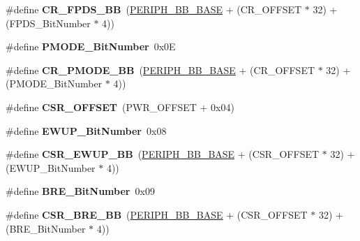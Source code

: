 \begin{DoxyCompactItemize}
\item 
\hypertarget{group___p_w_r_ga57d7041b5d1bf0ec94fa18152a7fa208}{}\#define {\bfseries C\+R\+\_\+\+F\+P\+D\+S\+\_\+\+B\+B}~(\hyperlink{group___peripheral__memory__map_gaed7efc100877000845c236ccdc9e144a}{P\+E\+R\+I\+P\+H\+\_\+\+B\+B\+\_\+\+B\+A\+S\+E} + (C\+R\+\_\+\+O\+F\+F\+S\+E\+T $\ast$ 32) + (F\+P\+D\+S\+\_\+\+Bit\+Number $\ast$ 4))\label{group___p_w_r_ga57d7041b5d1bf0ec94fa18152a7fa208}

\item 
\hypertarget{group___p_w_r_ga15fea9df1b0d324394336f70b319b377}{}\#define {\bfseries P\+M\+O\+D\+E\+\_\+\+Bit\+Number}~0x0\+E\label{group___p_w_r_ga15fea9df1b0d324394336f70b319b377}

\item 
\hypertarget{group___p_w_r_ga2e7c040f5c63f0fce3e274d9a03f1d1a}{}\#define {\bfseries C\+R\+\_\+\+P\+M\+O\+D\+E\+\_\+\+B\+B}~(\hyperlink{group___peripheral__memory__map_gaed7efc100877000845c236ccdc9e144a}{P\+E\+R\+I\+P\+H\+\_\+\+B\+B\+\_\+\+B\+A\+S\+E} + (C\+R\+\_\+\+O\+F\+F\+S\+E\+T $\ast$ 32) + (P\+M\+O\+D\+E\+\_\+\+Bit\+Number $\ast$ 4))\label{group___p_w_r_ga2e7c040f5c63f0fce3e274d9a03f1d1a}

\item 
\hypertarget{group___p_w_r_ga984cbe73312b6d3d355c5053763d499a}{}\#define {\bfseries C\+S\+R\+\_\+\+O\+F\+F\+S\+E\+T}~(P\+W\+R\+\_\+\+O\+F\+F\+S\+E\+T + 0x04)\label{group___p_w_r_ga984cbe73312b6d3d355c5053763d499a}

\item 
\hypertarget{group___p_w_r_ga94fe0520e8f9b71fa2b99c0565ec70ea}{}\#define {\bfseries E\+W\+U\+P\+\_\+\+Bit\+Number}~0x08\label{group___p_w_r_ga94fe0520e8f9b71fa2b99c0565ec70ea}

\item 
\hypertarget{group___p_w_r_gaaff864595f697850b19173b0bca991b0}{}\#define {\bfseries C\+S\+R\+\_\+\+E\+W\+U\+P\+\_\+\+B\+B}~(\hyperlink{group___peripheral__memory__map_gaed7efc100877000845c236ccdc9e144a}{P\+E\+R\+I\+P\+H\+\_\+\+B\+B\+\_\+\+B\+A\+S\+E} + (C\+S\+R\+\_\+\+O\+F\+F\+S\+E\+T $\ast$ 32) + (E\+W\+U\+P\+\_\+\+Bit\+Number $\ast$ 4))\label{group___p_w_r_gaaff864595f697850b19173b0bca991b0}

\item 
\hypertarget{group___p_w_r_ga1a0832bfe421cdd6f2640ffb625cc2d8}{}\#define {\bfseries B\+R\+E\+\_\+\+Bit\+Number}~0x09\label{group___p_w_r_ga1a0832bfe421cdd6f2640ffb625cc2d8}

\item 
\hypertarget{group___p_w_r_ga1451a5ec810860a7c2e28c23f0c0e928}{}\#define {\bfseries C\+S\+R\+\_\+\+B\+R\+E\+\_\+\+B\+B}~(\hyperlink{group___peripheral__memory__map_gaed7efc100877000845c236ccdc9e144a}{P\+E\+R\+I\+P\+H\+\_\+\+B\+B\+\_\+\+B\+A\+S\+E} + (C\+S\+R\+\_\+\+O\+F\+F\+S\+E\+T $\ast$ 32) + (B\+R\+E\+\_\+\+Bit\+Number $\ast$ 4))\label{group___p_w_r_ga1451a5ec810860a7c2e28c23f0c0e928}


\end{DoxyCompactItemize}

